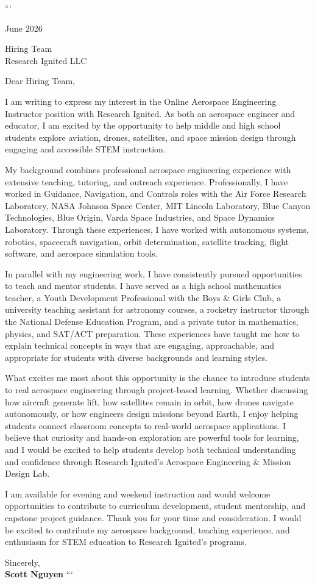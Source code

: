 \documentclass[11pt]{article}
\begin{document}
	
	```
	\vspace*{1.5cm}
	
	June 2026
	
	Hiring Team\\
	Research Ignited LLC
	
	Dear Hiring Team,
	
	I am writing to express my interest in the Online Aerospace Engineering Instructor position with Research Ignited. As both an aerospace engineer and educator, I am excited by the opportunity to help middle and high school students explore aviation, drones, satellites, and space mission design through engaging and accessible STEM instruction.
	
	My background combines professional aerospace engineering experience with extensive teaching, tutoring, and outreach experience. Professionally, I have worked in Guidance, Navigation, and Controls roles with the Air Force Research Laboratory, NASA Johnson Space Center, MIT Lincoln Laboratory, Blue Canyon Technologies, Blue Origin, Varda Space Industries, and Space Dynamics Laboratory. Through these experiences, I have worked with autonomous systems, robotics, spacecraft navigation, orbit determination, satellite tracking, flight software, and aerospace simulation tools.
	
	In parallel with my engineering work, I have consistently pursued opportunities to teach and mentor students. I have served as a high school mathematics teacher, a Youth Development Professional with the Boys \& Girls Club, a university teaching assistant for astronomy courses, a rocketry instructor through the National Defense Education Program, and a private tutor in mathematics, physics, and SAT/ACT preparation. These experiences have taught me how to explain technical concepts in ways that are engaging, approachable, and appropriate for students with diverse backgrounds and learning styles.
	
	What excites me most about this opportunity is the chance to introduce students to real aerospace engineering through project-based learning. Whether discussing how aircraft generate lift, how satellites remain in orbit, how drones navigate autonomously, or how engineers design missions beyond Earth, I enjoy helping students connect classroom concepts to real-world aerospace applications. I believe that curiosity and hands-on exploration are powerful tools for learning, and I would be excited to help students develop both technical understanding and confidence through Research Ignited's Aerospace Engineering \& Mission Design Lab.
	
	I am available for evening and weekend instruction and would welcome opportunities to contribute to curriculum development, student mentorship, and capstone project guidance. Thank you for your time and consideration. I would be excited to contribute my aerospace background, teaching experience, and enthusiasm for STEM education to Research Ignited's programs.
	
	Sincerely,\\[1.5em]
	\textbf{Scott Nguyen}
	```
	
\end{document}
